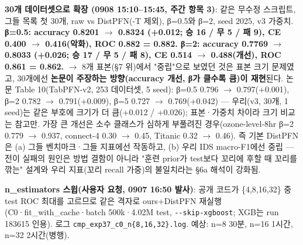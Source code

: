 \par\noindent \textbullet\enspace \textbf{30개 데이터셋으로 확장 (0908 15:10–15:45, 주간 항목 3)}: 같은 무수정 스크립트, 그들 목록 첫 30개, raw vs DistPFN(-T 제외), β=\allowbreak{}0.5와 β=\allowbreak{}2, seed 2025, v3 가중치. \textbf{β=\allowbreak{}0.5: accuracy 0.8201  \ensuremath{\rightarrow}  0.8324 (+\allowbreak{}0.012; 승 16 /\allowbreak{} 무 5 /\allowbreak{} 패 9), CE 0.400  \ensuremath{\rightarrow}  0.416(악화), ROC 0.882 =\allowbreak{} 0.882. β=\allowbreak{}2: accuracy 0.7769  \ensuremath{\rightarrow}  0.8033 (+\allowbreak{}0.026; 승 17 /\allowbreak{} 무 5 /\allowbreak{} 패 8), CE 0.514  \ensuremath{\rightarrow}  0.488(개선), ROC 0.861 =\allowbreak{} 0.862.}  \ensuremath{\rightarrow}  8개 표본(§7 위)에서 "중립"으로 보였던 것은 표본 크기 문제였고, 30개에선 \textbf{논문이 주장하는 방향(accuracy 개선, β가 클수록 큼)이 재현}된다. 논문 Table 10(TabPFN-v2, 253 데이터셋, 5 seed): β=\allowbreak{}0.5 0.796 \ensuremath{\rightarrow} 0.797(+\allowbreak{}0.001), β=\allowbreak{}2 0.782 \ensuremath{\rightarrow} 0.791(+\allowbreak{}0.009), β=\allowbreak{}5 0.727 \ensuremath{\rightarrow} 0.769(+\allowbreak{}0.042) — 우리(v3, 30개, 1 seed)는 같은 부호에 크기가 더 큼(+\allowbreak{}0.012 /\allowbreak{} +\allowbreak{}0.026); 표본·가중치 차이라 크기 비교는 참고만. 가장 큰 개선은 소수 클래스가 심하게 부풀려진 경우(ozone-level-8hr β=\allowbreak{}2 0.779 \ensuremath{\rightarrow} 0.937, connect-4 0.30 \ensuremath{\rightarrow} 0.45, Titanic 0.32 \ensuremath{\rightarrow} 0.46). 즉 기본 DistPFN은 (a) 그들 벤치마크·그들 지표에선 작동하고, (b) 우리 IDS macro-F1에선 중립 — 전이 실패의 원인은 방법 결함이 아니라 "훈련 prior가 test보다 꼬리에 후할 때 꼬리를 깎는" 설계와 우리 지표(꼬리 recall 가중)의 불일치라는 §6a 해석이 강화됨.


\par\noindent \textbullet\enspace \textbf{n\_\allowbreak{}estimators 스윕(사용자 요청, 0907 16:50 발사)}: 공개 코드가 \{4,8,16,32\} 중 test ROC 최대를 고르므로 같은 격자로 ours+\allowbreak{}DistPFN 재실행 (C0·fit\_\allowbreak{}with\_\allowbreak{}cache·batch 500k·4.02M test, \texttt{-\allowbreak{}-\allowbreak{}skip-\allowbreak{}x\allowbreak{}gboost}; XGB는 run 183615 인용). 로그 \texttt{cmp\_\allowbreak{}\allowbreak{}exp3\allowbreak{}7\_\allowbreak{}\allowbreak{}c0\_\allowbreak{}\allowbreak{}n\{\allowbreak{}8\allowbreak{},\allowbreak{}16,\allowbreak{}32\}\allowbreak{}.\allowbreak{}log}. 예상: n=\allowbreak{}8 30분, n=\allowbreak{}16 1시간, n=\allowbreak{}32 2시간(병행).


